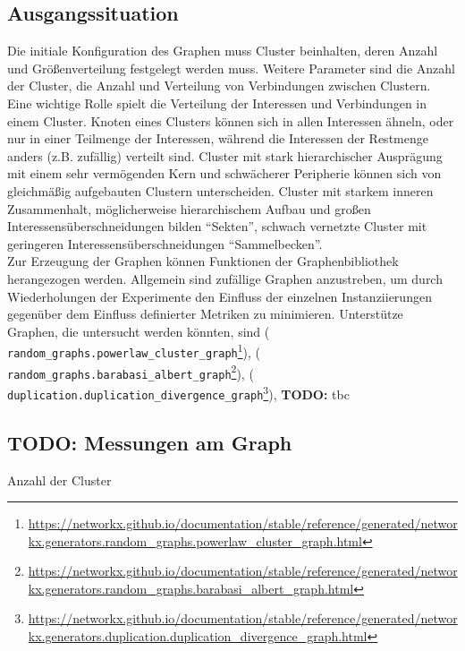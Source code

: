 \documentclass[11pt, a4paper]{scrartcl}
\newcommand{\nx}[1]{\texttt{#1}}
\newcommand*{\ToDo}[1]{{\color{ToDoColor}\textbf{TODO:} #1}}
\begin{document}
\subsection{Ausgangssituation}
Die initiale Konfiguration des Graphen muss Cluster beinhalten, deren Anzahl und Größenverteilung festgelegt werden muss. Weitere Parameter sind die Anzahl der Cluster, die Anzahl und Verteilung von Verbindungen zwischen Clustern.
\\
Eine wichtige Rolle spielt die Verteilung der Interessen und Verbindungen in einem Cluster. Knoten eines Clusters können sich in allen Interessen ähneln, oder nur in einer Teilmenge der Interessen, während die Interessen der Restmenge anders (z.B. zufällig) verteilt sind. Cluster mit stark hierarchischer Ausprägung mit einem sehr vermögenden Kern und schwächerer Peripherie können sich von gleichmäßig aufgebauten Clustern unterscheiden. Cluster mit starkem inneren Zusammenhalt, möglicherweise hierarchischem Aufbau und großen Interessensüberschneidungen bilden "`Sekten"', schwach vernetzte Cluster mit geringeren Interessensüberschneidungen "`Sammelbecken"'.
\\
Zur Erzeugung der Graphen können Funktionen der Graphenbibliothek \autocite{networkx} herangezogen werden. Allgemein sind zufällige Graphen anzustreben, um durch Wiederholungen der Experimente den Einfluss der einzelnen Instanziierungen gegenüber dem Einfluss definierter Metriken zu minimieren.
Unterstütze Graphen, die untersucht werden könnten, sind \autocite{Holme2002} (\nx{%
random\_graphs.powerlaw\_cluster\_graph}\footnote{\url{https://networkx.github.io/documentation/stable/reference/generated/networkx.generators.random_graphs.powerlaw_cluster_graph.html}}), \autocite{Barabasi509} (\nx{%
random\_graphs.barabasi\_albert\_graph}\footnote{\url{https://networkx.github.io/documentation/stable/reference/generated/networkx.generators.random_graphs.barabasi_albert_graph.html}}), \autocite{Ispolatov2005} (\nx{%
duplication.duplication\_divergence\_graph}\footnote{\url{https://networkx.github.io/documentation/stable/reference/generated/networkx.generators.duplication.duplication_divergence_graph.html}}), \ToDo{tbc}

\subsection{\ToDo{Messungen am Graph}}
Anzahl der Cluster
\end{document}
